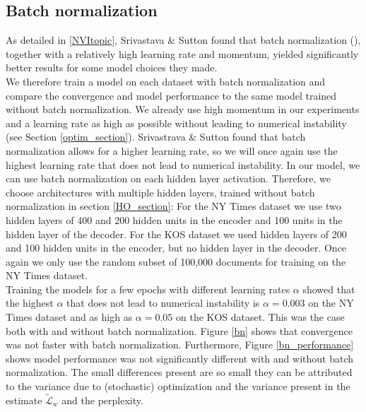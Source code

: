 \documentclass{report}
\begin{document}
	\subsection{Batch normalization}\label{batch_norm}
	As detailed in \ref{NVItopic}, Srivastava \& Sutton \cite{srivastava2017neural} found that  batch normalization (\cite{srivastava2017neural}), together with a relatively high learning rate and momentum, yielded significantly better results for some model choices they made. \\
	We therefore train a model on each dataset with batch normalization and compare the convergence and model performance to the same model trained without batch normalization. We already use high momentum in our experiments and a learning rate as high as possible without leading to numerical instability (see Section \ref{optim_section}). Srivastrava \& Sutton \cite{srivastava2017neural} found that batch normalization allows for a higher learning rate, so we will once again use the highest learning rate that does not lead to numerical instability.	In our model, we can use batch normalization on each hidden layer activation. Therefore, we choose architectures with multiple hidden layers, trained without batch normalization in section \ref{HO_section}: For the NY Times dataset we use two hidden layers of  400 and 200 hidden units in the encoder and 100 units in the hidden layer of the decoder. For the KOS dataset we used hidden layers of 200 and 100 hidden units in the encoder, but no hidden layer in the decoder.
	Once again we only use the random subset of 100,000 documents for training on the NY Times dataset. \\
	Training the models for a few epochs with different learning rates $\alpha$ showed that the highest $\alpha$ that does not lead to numerical instability is $\alpha = 0.003$ on the NY Times dataset and as high as $\alpha = 0.05$ on the KOS dataset. This was the case both with and without batch normalization. Figure \ref{bn} shows that convergence was not faster with batch normalization. Furthermore, Figure \ref{bn_performance} shows model performance was not significantly different with and without batch normalization. The small differences present are so small they can be attributed to the variance due to (stochastic) optimization and the variance present in the estimate $\tilde{\mathcal{L}}_w$ and the perplexity.
		
\end{document}
